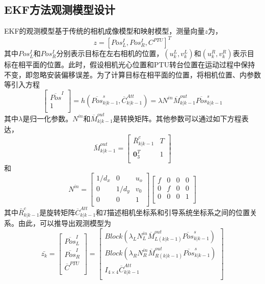 \subsection{EKF方法观测模型设计}
EKF的观测模型基于传统的相机成像模型和映射模型，测量向量$z$为，
\begin{equation}
z=[Pos^I_L, Pos^I_R, C^{PTU}]^T
\end{equation} 
其中$Pos^I_L$和$Pos^I_R$分别表示目标在左右相机的位置，$(u^L_k, v^L_k)$和$(u^R_k, v^R_k)$表示目标在相平面的位置。此时，假设相机光心位置和PTU转台位置在运动过程中保持不变，即忽略安装偏移误差。为了计算目标在相平面的位置，将相机位置、内参数等引入方程
\begin{equation}
\left[\begin{matrix}
\overline{Pos}^I \\
1\\
\end{matrix}\right]
=h(\overline{Pos}^s_{k|k-1}, \overline{C}^{Att}_{k|k-1})
=\lambda N^{in}\overline{M}^{out}_{k|k-1}\overline{Pos}^s_{k|k-1}
\end{equation}
其中$\lambda$是归一化参数。$N^{in}$和$\overline{M}^{out}_{k|k-1}$是转换矩阵。其他参数可以通过如下方程表达，
\begin{equation}
\overline{M}^{out}_{k|k-1}
= \left[
\begin{matrix}
\bar{R}^c_{k|k-1} & T \\
\textbf{0}^T_3 & 1 \\
\end{matrix}
\right]
\end{equation}
和
\begin{equation}
N^{in}=
\left[
\begin{matrix}
1/d_x & 0 & u_o \\
0 & 1/d_y & v_0 \\
0 & 0 & 1 \\
\end{matrix}
\right]
\left[
\begin{matrix}
f & 0 & 0 & 0 \\
0 & f & 0 & 0 \\
0 & 0 & 0 & 1 \\
\end{matrix}
\right]
\end{equation}
其中$\bar{R}^c_{k|k-1}$是旋转矩阵$\overline{C}^{Att}_{k|k-1}$和$T$描述相机坐标系和引导系统坐标系之间的位置关系。由此，可以推导出观测模型为
\begin{equation}
\bar{z_k}=
\left[
\begin{matrix}
\overline{Pos}^I_L \\
\overline{Pos}^I_R \\
\overline{C}^{PTU} \\
\end{matrix}
\right]
=
\left[
\begin{matrix}
Block (\lambda_L N^{in}_L \overline{M}^{out}_{L(k|k-1)}\overline{Pos}^s_{k|k-1} )\\
Block (\lambda_R N^{in}_R\overline{M}^{out}_{R(k|k-1)}\overline{Pos}^s_{k|k-1}  )\\
I_{4 \times 4}\overline{C}^{Att}_{k|k-1} \\
\end{matrix}
\right]
\end{equation}
